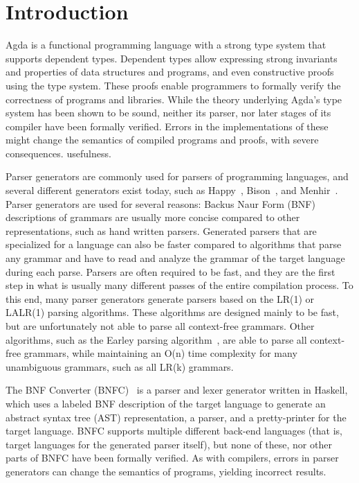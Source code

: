 \chapter{Introduction}

	Agda is a functional programming language with a strong type system that
	supports dependent types. Dependent types allow expressing strong
	invariants and properties of data structures and programs, and even
	constructive proofs using the type system. These proofs enable programmers
	to formally verify the correctness of programs and libraries. While the
	theory underlying Agda's type system has been shown to be sound, neither
	its parser, nor later stages of its compiler have been formally verified.
	Errors in the implementations of these might change the semantics of
	compiled programs and proofs, with severe consequences. %
	usefulness.

	Parser generators are commonly used for parsers of programming languages,
	and several different generators exist today, such as Happy~\cite{Happy},
	Bison~\cite{Bison}, and Menhir~\cite{Menhir}. Parser generators are used
	for several reasons: Backus Naur Form (BNF) descriptions of grammars are
	usually more concise compared to other representations, such as hand
	written parsers. Generated parsers that are specialized for a language can
	also be faster compared to algorithms that parse any grammar and have to
	read and analyze the grammar of the target language during each parse.
	Parsers are often required to be fast, and they are the first step in what
	is usually many different passes of the entire compilation process. To this
	end, many parser generators generate parsers based on the LR(1) or LALR(1)
	parsing algorithms. These algorithms are designed mainly to be fast, but
	are unfortunately not able to parse all context-free grammars. Other
	algorithms, such as the Earley parsing algorithm~\cite{Earley}, are able to
	parse all context-free grammars, while maintaining an O(n) time complexity
	for many unambiguous grammars, such as all LR(k) grammars.

	The BNF Converter (BNFC)~\cite{BNFC} is a parser and lexer generator
	written in Haskell, which uses a labeled BNF description of the target
	language to generate an abstract syntax tree (AST) representation, a
	parser, and a pretty-printer for the target language. BNFC supports
	multiple different back-end languages (that is, target languages for the
	generated parser itself), but none of these, nor other parts of BNFC have
	been formally verified. As with compilers, errors in parser generators can
	change the semantics of programs, yielding incorrect results.

